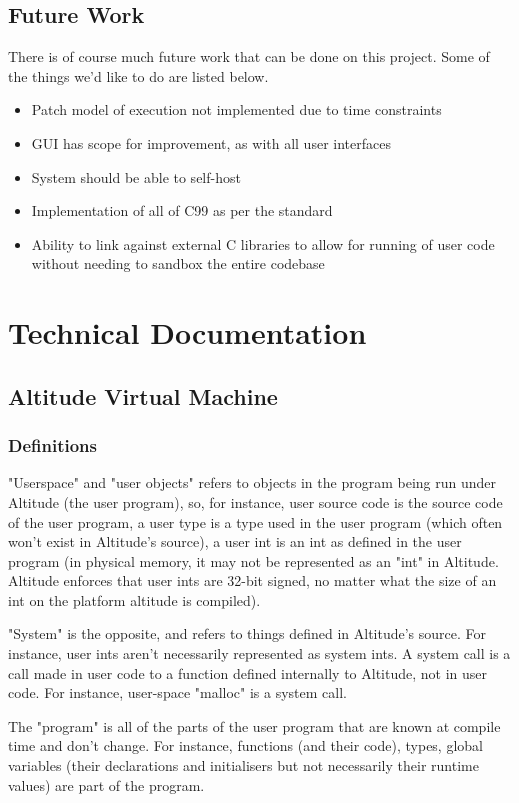 \documentclass[10pt,a4paper]{report}
\begin{document}
\section{Future Work}
There is of course much future work that can be done on this project. Some of the things we'd like to do are listed below.
\begin{itemize}
\item Patch model of execution not implemented due to time constraints
\item GUI has scope for improvement, as with all user interfaces
\item System should be able to self-host
\item Implementation of all of C99 as per the standard
\item Ability to link against external C libraries to allow for running of user code without needing to sandbox the entire codebase
\end{itemize}

\chapter{Technical Documentation}
\section{Altitude Virtual Machine}

\subsection{Definitions}
"Userspace" and "user objects" refers to objects in the program being run under Altitude (the user program), so, for instance, user source code is the source code of the user program, a user type is a type used in the user program (which often won't exist in Altitude's source), a user int is an int as defined in the user program (in physical memory, it may not be represented as an "int" in Altitude. Altitude enforces that user ints are 32-bit signed, no matter what the size of an int on the platform altitude is compiled).

"System" is the opposite, and refers to things defined in Altitude's source. For instance, user ints aren't necessarily represented as system ints. A system call is a call made in user code to a function defined internally to Altitude, not in user code. For instance, user-space "malloc" is a system call.

The "program" is all of the parts of the user program that are known at compile time and don't change. For instance, functions (and their code), types, global variables (their declarations and initialisers but not necessarily their runtime values) are part of the program.
\end{document}
